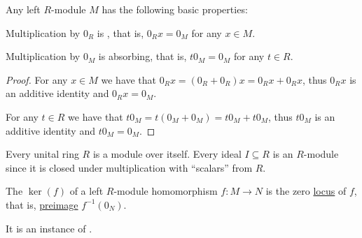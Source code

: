 \begin{proposition}\label{thm:left_module_properties}
  Any left \( R \)-module \( M \) has the following basic properties:
  \begin{thmenum}
     Multiplication by \( 0_R \) is , that is, \( 0_R x = 0_M \) for any \( x \in M \).

     Multiplication by \( 0_M \) is absorbing, that is, \( t 0_M = 0_M \) for any \( t \in R \).
  \end{thmenum}
\end{proposition}
\begin{proof}
   For any \( x \in M \) we have that \( 0_R x = (0_R + 0_R)x = 0_R x + 0_R x \), thus \( 0_R x \) is an additive identity and \( 0_R x = 0_M \).

   For any \( t \in R \) we have that \( t 0_M = t (0_M + 0_M) = t 0_M + t 0_M \), thus \( t 0_M \) is an additive identity and \( t 0_M = 0_M \).
\end{proof}

\begin{example}\label{ex:module/ideal_of_ring}
  Every unital ring \( R \) is a module over itself. Every ideal \( I \subseteq R \) is an \( R \)-module since it is closed under multiplication with \enquote{scalars} from \( R \).
\end{example}

\begin{definition}\label{def:left_module_kernel}
  The  \( \ker(f) \) of a left \( R \)-module homomorphism \( f: M \to N \) is the zero \hyperref[def:zero_locus]{locus} of \( f \), that is, \hyperref[def:function/preimage]{preimage} \( f^{-1}(0_N) \).

  It is an instance of .
\end{definition}

